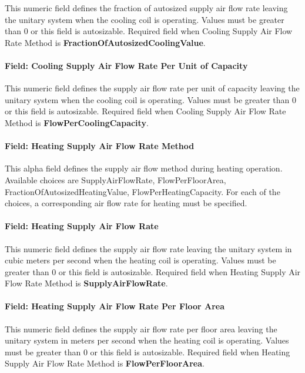 This numeric field defines the fraction of autosized supply air flow rate leaving the unitary system when the cooling coil is operating. Values must be greater than 0 or this field is autosizable. Required field when Cooling Supply Air Flow Rate Method is \textbf{FractionOfAutosizedCoolingValue}.

\paragraph{Field: Cooling Supply Air Flow Rate Per Unit of Capacity}\label{field-cooling-supply-air-flow-rate-per-unit-of-capacity}

This numeric field defines the supply air flow rate per unit of capacity leaving the unitary system when the cooling coil is operating. Values must be greater than 0 or this field is autosizable. Required field when Cooling Supply Air Flow Rate Method is \textbf{FlowPerCoolingCapacity}.

\paragraph{Field: Heating Supply Air Flow Rate Method}\label{field-heating-supply-air-flow-rate-method-000}

This alpha field defines the supply air flow method during heating operation. Available choices are SupplyAirFlowRate, FlowPerFloorArea, FractionOfAutosizedHeatingValue, FlowPerHeatingCapacity. For each of the choices, a corresponding air flow rate for heating must be specified.

\paragraph{Field: Heating Supply Air Flow Rate}\label{field-heating-supply-air-flow-rate-001}

This numeric field defines the supply air flow rate leaving the unitary system in cubic meters per second when the heating coil is operating. Values must be greater than 0 or this field is autosizable. Required field when Heating Supply Air Flow Rate Method is \textbf{SupplyAirFlowRate}.

\paragraph{Field: Heating Supply Air Flow Rate Per Floor Area}\label{field-heating-supply-air-flow-rate-per-floor-area}

This numeric field defines the supply air flow rate per floor area leaving the unitary system in meters per second when the heating coil is operating. Values must be greater than 0 or this field is autosizable. Required field when Heating Supply Air Flow Rate Method is \textbf{FlowPerFloorArea}.

